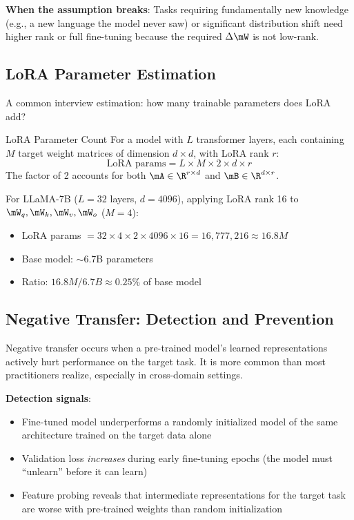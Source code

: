 \textbf{When the assumption breaks}: Tasks requiring fundamentally new knowledge (e.g., a new language the model never saw) or significant distribution shift need higher rank or full fine-tuning because the required $\Delta \mW$ is not low-rank.

\subsection{LoRA Parameter Estimation}

A common interview estimation: how many trainable parameters does LoRA add?

\begin{mathresult}{LoRA Parameter Count}
For a model with $L$ transformer layers, each containing $M$ target weight matrices of dimension $d \times d$, with LoRA rank $r$:
\begin{equation}
\text{LoRA params} = L \times M \times 2 \times d \times r
\end{equation}
The factor of 2 accounts for both $\mA \in \R^{r \times d}$ and $\mB \in \R^{d \times r}$.
\end{mathresult}

\begin{example}
For LLaMA-7B ($L = 32$ layers, $d = 4096$), applying LoRA rank 16 to $\mW_q, \mW_k, \mW_v, \mW_o$ ($M = 4$):
\begin{itemize}
    \item LoRA params $= 32 \times 4 \times 2 \times 4096 \times 16 = 16{,}777{,}216 \approx 16.8M$
    \item Base model: $\sim$6.7B parameters
    \item Ratio: $16.8M / 6.7B \approx 0.25\%$ of base model
\end{itemize}
\end{example}

\subsection{Negative Transfer: Detection and Prevention}

Negative transfer occurs when a pre-trained model's learned representations actively hurt performance on the target task. It is more common than most practitioners realize, especially in cross-domain settings.

\textbf{Detection signals}:
\begin{itemize}
    \item Fine-tuned model underperforms a randomly initialized model of the same architecture trained on the target data alone
    \item Validation loss \textit{increases} during early fine-tuning epochs (the model must ``unlearn'' before it can learn)
    \item Feature probing reveals that intermediate representations for the target task are worse with pre-trained weights than random initialization
\end{itemize}

